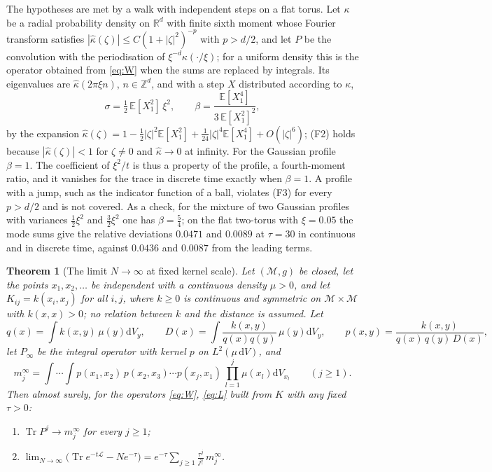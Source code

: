 \documentclass[11pt,a4paper]{article}
\theoremstyle{stmt}
\newtheorem{theorem}{Theorem}[section]
\theoremstyle{defn}
\theoremstyle{rmk}
\numberwithin{equation}{section}
\DeclareMathOperator{\Tr}{Tr}
\newcommand{\M}{\mathcal{M}}
\newcommand{\Lc}{\mathcal{L}}
\newcommand{\R}{\mathbb{R}}
\newcommand{\dd}{\mathrm{d}}
\begin{document}
{The hypotheses are met by a walk with independent steps on a flat torus. Let $\kappa$ be a radial probability density on $\R^d$ with finite sixth moment whose Fourier transform satisfies $|\hat\kappa(\zeta)|\le C(1+|\zeta|^2)^{-p}$ with $p>d/2$, and let $P$ be the convolution with the periodisation of $\xi^{-d}\kappa(\cdot/\xi)$; for a uniform density this is the operator obtained from \eqref{eq:W} when the sums are replaced by integrals. Its eigenvalues are $\hat\kappa(2\pi\xi n)$, $n\in\mathbb Z^d$, and with a step $X$ distributed according to $\kappa$,
\begin{equation}\label{eq:beta}
\sigma=\tfrac12\,\mathbb E[X_1^2]\,\xi^2,\qquad\beta=\frac{\mathbb E[X_1^4]}{3\,\mathbb E[X_1^2]^2},
\end{equation}
by the expansion $\hat\kappa(\zeta)=1-\tfrac12|\zeta|^2\mathbb E[X_1^2]+\tfrac1{24}|\zeta|^4\mathbb E[X_1^4]+O(|\zeta|^6)$; (F2) holds because $|\hat\kappa(\zeta)|<1$ for $\zeta\ne0$ and $\hat\kappa\to0$ at infinity. For the Gaussian profile $\beta=1$. The coefficient of $\xi^2/t$ is thus a property of the profile, a fourth-moment ratio, and it vanishes for the trace in discrete time exactly when $\beta=1$. A profile with a jump, such as the indicator function of a ball, violates (F3) for every $p>d/2$ and is not covered. As a check, for the mixture of two Gaussian profiles with variances $\tfrac12\xi^2$ and $\tfrac32\xi^2$ one has $\beta=\tfrac54$; on the flat two-torus with $\xi=0.05$ the mode sums give the relative deviations $0.0471$ and $0.0089$ at $\tau=30$ in continuous and in discrete time, against $0.0436$ and $0.0087$ from the leading terms.

\begin{theorem}[The limit $N\to\infty$ at fixed kernel scale]\label{thm:fixedxi}
Let $(\M,g)$ be closed, let the points $x_1,x_2,\dots$ be independent with a continuous density $\mu>0$, and let $K_{ij}=k(x_i,x_j)$ for all $i,j$, where $k\ge0$ is continuous and symmetric on $\M\times\M$ with $k(x,x)>0$; no relation between $k$ and the distance is assumed. Let
\[
q(x)=\int k(x,y)\,\mu(y)\dd V_y,\qquad D(x)=\int\frac{k(x,y)}{q(x)q(y)}\,\mu(y)\dd V_y,\qquad p(x,y)=\frac{k(x,y)}{q(x)\,q(y)\,D(x)},
\]
let $P_\infty$ be the integral operator with kernel $p$ on $L^2(\mu\,\dd V)$, and
\[
m_j^\infty=\int\!\!\cdots\!\!\int p(x_1,x_2)\,p(x_2,x_3)\cdots p(x_j,x_1)\,\prod_{l=1}^j\mu(x_l)\dd V_{x_l}\qquad(j\ge1).
\]
Then almost surely, for the operators \eqref{eq:W}, \eqref{eq:L} built from $K$ with any fixed $\tau>0$:
\begin{enumerate}[label=\textup{(\roman*)}]
\item $\Tr P^j\to m_j^\infty$ for every $j\ge1$;
\item $\displaystyle\lim_{N\to\infty}\big(\Tr e^{-t\Lc}-Ne^{-\tau}\big)=e^{-\tau}\sum_{j\ge1}\frac{\tau^j}{j!}\,m_j^\infty$.
\end{enumerate}
\end{theorem}

}
\end{document}
